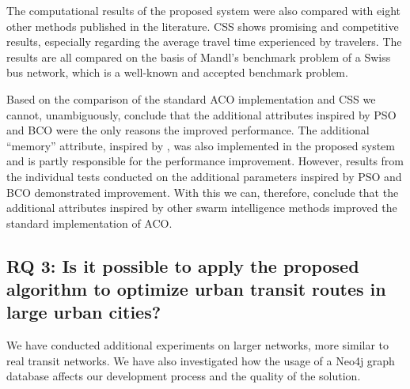 The computational results of the proposed system were also compared with eight other methods published in the literature. CSS shows promising and competitive results, especially regarding the average travel time experienced by travelers. The results are all compared on the basis of Mandl's benchmark problem of a Swiss bus network, which is a well-known and accepted benchmark problem. 



Based on the comparison of the standard ACO implementation and CSS we cannot, unambiguously, conclude that the additional attributes inspired by PSO and BCO were the only reasons the improved performance. The additional ``memory'' attribute, inspired by \citet{dorigo96, sedighpour14, poorzahedy11, salehinejad10}, was also implemented in the proposed system and is partly responsible for the performance improvement. However, results from the individual tests conducted on the additional parameters inspired by PSO and BCO demonstrated improvement. With this we can, therefore, conclude that the additional attributes inspired by other swarm intelligence methods improved the standard implementation of ACO. 

\subsection*{RQ 3: Is it possible to apply the proposed algorithm to optimize urban transit routes in large urban cities?}

We have conducted additional experiments on larger networks, more similar to real transit networks. We have also investigated how the usage of a Neo4j graph database affects our development process and the quality of the solution. 


